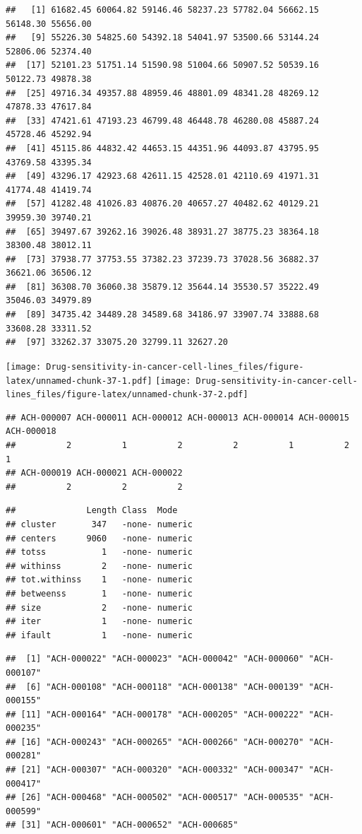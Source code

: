 \documentclass[
]{article}
\begin{document}
\begin{verbatim}
##   [1] 61682.45 60064.82 59146.46 58237.23 57782.04 56662.15 56148.30 55656.00
##   [9] 55226.30 54825.60 54392.18 54041.97 53500.66 53144.24 52806.06 52374.40
##  [17] 52101.23 51751.14 51590.98 51004.66 50907.52 50539.16 50122.73 49878.38
##  [25] 49716.34 49357.88 48959.46 48801.09 48341.28 48269.12 47878.33 47617.84
##  [33] 47421.61 47193.23 46799.48 46448.78 46280.08 45887.24 45728.46 45292.94
##  [41] 45115.86 44832.42 44653.15 44351.96 44093.87 43795.95 43769.58 43395.34
##  [49] 43296.17 42923.68 42611.15 42528.01 42110.69 41971.31 41774.48 41419.74
##  [57] 41282.48 41026.83 40876.20 40657.27 40482.62 40129.21 39959.30 39740.21
##  [65] 39497.67 39262.16 39026.48 38931.27 38775.23 38364.18 38300.48 38012.11
##  [73] 37938.77 37753.55 37382.23 37239.73 37028.56 36882.37 36621.06 36506.12
##  [81] 36308.70 36060.38 35879.12 35644.14 35530.57 35222.49 35046.03 34979.89
##  [89] 34735.42 34489.28 34589.68 34186.97 33907.74 33888.68 33608.28 33311.52
##  [97] 33262.37 33075.20 32799.11 32627.20
\end{verbatim}

\texttt{[image: Drug-sensitivity-in-cancer-cell-lines\_files/figure-latex/unnamed-chunk-37-1.pdf]}
\texttt{[image: Drug-sensitivity-in-cancer-cell-lines\_files/figure-latex/unnamed-chunk-37-2.pdf]}

\begin{verbatim}
## ACH-000007 ACH-000011 ACH-000012 ACH-000013 ACH-000014 ACH-000015 ACH-000018 
##          2          1          2          2          1          2          1 
## ACH-000019 ACH-000021 ACH-000022 
##          2          2          2
\end{verbatim}

\begin{verbatim}
##              Length Class  Mode   
## cluster       347   -none- numeric
## centers      9060   -none- numeric
## totss           1   -none- numeric
## withinss        2   -none- numeric
## tot.withinss    1   -none- numeric
## betweenss       1   -none- numeric
## size            2   -none- numeric
## iter            1   -none- numeric
## ifault          1   -none- numeric
\end{verbatim}

\begin{verbatim}
##  [1] "ACH-000022" "ACH-000023" "ACH-000042" "ACH-000060" "ACH-000107"
##  [6] "ACH-000108" "ACH-000118" "ACH-000138" "ACH-000139" "ACH-000155"
## [11] "ACH-000164" "ACH-000178" "ACH-000205" "ACH-000222" "ACH-000235"
## [16] "ACH-000243" "ACH-000265" "ACH-000266" "ACH-000270" "ACH-000281"
## [21] "ACH-000307" "ACH-000320" "ACH-000332" "ACH-000347" "ACH-000417"
## [26] "ACH-000468" "ACH-000502" "ACH-000517" "ACH-000535" "ACH-000599"
## [31] "ACH-000601" "ACH-000652" "ACH-000685"
\end{verbatim}
\end{document}
